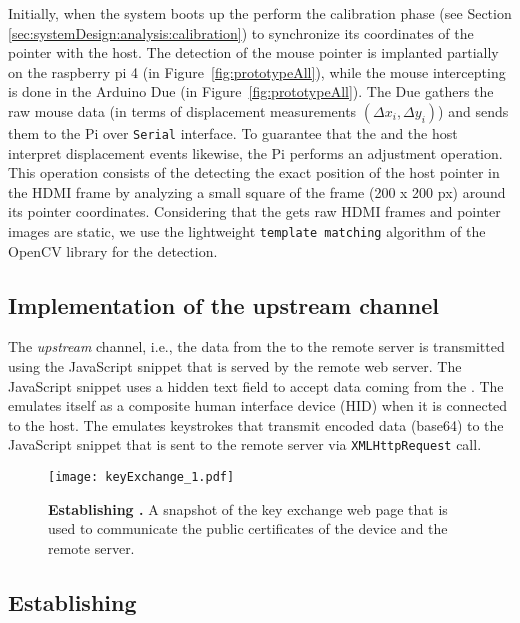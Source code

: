 Initially, when the system boots up the \device perform the calibration phase (see Section \ref{sec:systemDesign:analysis:calibration}) to synchronize its coordinates of the pointer with the host. The detection of the mouse pointer is implanted partially on the raspberry pi 4 (\six in Figure~\ref{fig:prototypeAll}), while the mouse intercepting is done in the Arduino Due (\three in Figure~\ref{fig:prototypeAll}). The Due gathers the raw mouse data (in terms of displacement measurements $(\Delta x_i, \Delta y_i)$) and sends them to the Pi over \texttt{Serial} interface.  To guarantee that the \device and the host interpret displacement events likewise, the Pi performs an adjustment operation. This operation consists of the \device detecting the exact position of the host pointer in the HDMI frame by analyzing a small square of the frame (200 x 200 px) around its pointer coordinates. Considering that the \device gets raw HDMI frames and pointer images are static, we use the lightweight \texttt{template matching} algorithm of the OpenCV library for the detection.

\subsection{\bfseries Implementation of the upstream channel}
\label{sec:prototype:impl:upstream}

 The \emph{upstream} channel, i.e., the data from the \device to the remote server is transmitted using the \name JavaScript snippet that is served by the remote web server. The \name JavaScript snippet uses a hidden text field to accept data coming from the \device. The \device emulates itself as a composite human interface device (HID) when it is connected to the host. The \device emulates keystrokes that transmit encoded data (base64) to the \name JavaScript snippet that is sent to the remote server via \texttt{XMLHttpRequest} call.

\begin{figure}[t]
\centering
\texttt{[image: keyExchange\_1.pdf]}
\caption{\textbf{Establishing \tls.} A snapshot of the key exchange web page that is used to communicate the public certificates of the device and the remote server.}
\spacesave
\label{fig:keyExchange}
\centering
\end{figure} 

\subsection{\bfseries Establishing \tls}
\label{sec:prototype:impl:tls}

